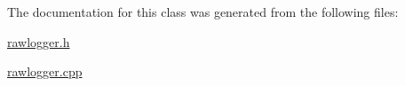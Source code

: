 The documentation for this class was generated from the following files\-:\begin{DoxyCompactItemize}
\item 
\hyperlink{rawlogger_8h}{rawlogger.\-h}\item 
\hyperlink{rawlogger_8cpp}{rawlogger.\-cpp}\end{DoxyCompactItemize}

